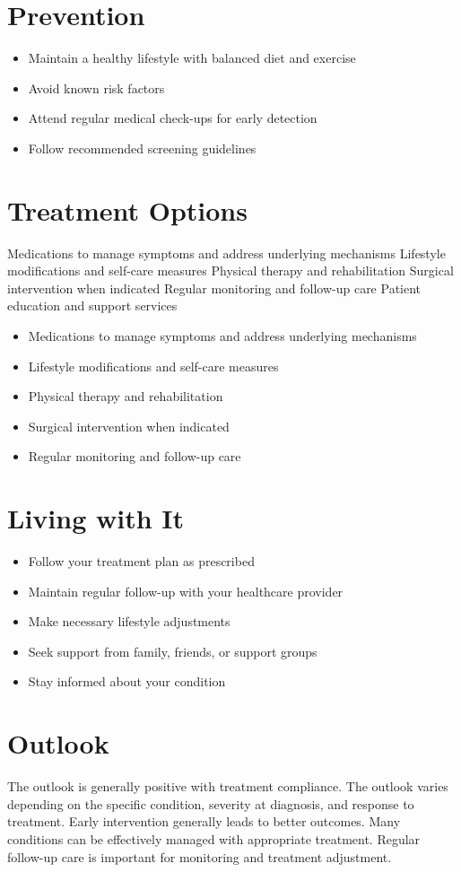 \section{Prevention}
\begin{itemize}[noitemsep]
  \item Maintain a healthy lifestyle with balanced diet and exercise
  \item Avoid known risk factors
  \item Attend regular medical check-ups for early detection
  \item Follow recommended screening guidelines
\end{itemize}
\section{Treatment Options}
Medications to manage symptoms and address underlying mechanisms Lifestyle modifications and self-care measures Physical therapy and rehabilitation Surgical intervention when indicated Regular monitoring and follow-up care Patient education and support services

\begin{itemize}[noitemsep]
  \item Medications to manage symptoms and address underlying mechanisms
  \item Lifestyle modifications and self-care measures
  \item Physical therapy and rehabilitation
  \item Surgical intervention when indicated
  \item Regular monitoring and follow-up care
\end{itemize}
\section{Living with It}
\begin{itemize}[noitemsep]
  \item Follow your treatment plan as prescribed
  \item Maintain regular follow-up with your healthcare provider
  \item Make necessary lifestyle adjustments
  \item Seek support from family, friends, or support groups
  \item Stay informed about your condition
\end{itemize}
\section{Outlook}
The outlook is generally positive with treatment compliance. The outlook varies depending on the specific condition, severity at diagnosis, and response to treatment. Early intervention generally leads to better outcomes. Many conditions can be effectively managed with appropriate treatment. Regular follow-up care is important for monitoring and treatment adjustment.
